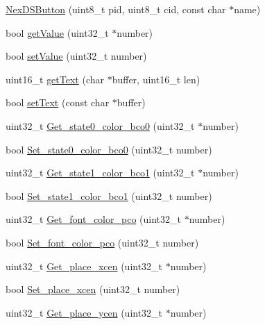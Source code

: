 \begin{DoxyCompactItemize}
\item 
\hyperlink{class_nex_d_s_button_a226edd2467f2fdf54848f5235b808e2b}{Nex\+D\+S\+Button} (uint8\+\_\+t pid, uint8\+\_\+t cid, const char $\ast$name)
\item 
bool \hyperlink{class_nex_d_s_button_a63e08f9a79f326c47aa66e1d0f9648c8}{get\+Value} (uint32\+\_\+t $\ast$number)
\item 
bool \hyperlink{class_nex_d_s_button_a2f696207609e0f01aadebb8b3826b0fa}{set\+Value} (uint32\+\_\+t number)
\item 
uint16\+\_\+t \hyperlink{class_nex_d_s_button_aff0f17061441139bf8797c78e4911eae}{get\+Text} (char $\ast$buffer, uint16\+\_\+t len)
\item 
bool \hyperlink{class_nex_d_s_button_aa7a83123530f2dbb3e6aa909352da5b2}{set\+Text} (const char $\ast$buffer)
\item 
uint32\+\_\+t \hyperlink{class_nex_d_s_button_a57119c8695b1dc562319b19864b68203}{Get\+\_\+state0\+\_\+color\+\_\+bco0} (uint32\+\_\+t $\ast$number)
\item 
bool \hyperlink{class_nex_d_s_button_a7276699c1ea7fccf4e52ad05443b8191}{Set\+\_\+state0\+\_\+color\+\_\+bco0} (uint32\+\_\+t number)
\item 
uint32\+\_\+t \hyperlink{class_nex_d_s_button_aa4ce6ec7a670af2df6bd5858ea20e430}{Get\+\_\+state1\+\_\+color\+\_\+bco1} (uint32\+\_\+t $\ast$number)
\item 
bool \hyperlink{class_nex_d_s_button_a42f31d9e9612d7f8403dcf46ef5e8f1a}{Set\+\_\+state1\+\_\+color\+\_\+bco1} (uint32\+\_\+t number)
\item 
uint32\+\_\+t \hyperlink{class_nex_d_s_button_a01a5a7238547cd761b69c49f1619f955}{Get\+\_\+font\+\_\+color\+\_\+pco} (uint32\+\_\+t $\ast$number)
\item 
bool \hyperlink{class_nex_d_s_button_a25e696769de8d33a3e49db15e0b55aaa}{Set\+\_\+font\+\_\+color\+\_\+pco} (uint32\+\_\+t number)
\item 
uint32\+\_\+t \hyperlink{class_nex_d_s_button_ae65ba8eab275c097fa1f9e7f8873dc5d}{Get\+\_\+place\+\_\+xcen} (uint32\+\_\+t $\ast$number)
\item 
bool \hyperlink{class_nex_d_s_button_a0bc679dfaca7aa0439f67bb91814f97a}{Set\+\_\+place\+\_\+xcen} (uint32\+\_\+t number)
\item 
uint32\+\_\+t \hyperlink{class_nex_d_s_button_a2b5c825ceaeeaa588b4830da4f154b23}{Get\+\_\+place\+\_\+ycen} (uint32\+\_\+t $\ast$number)
\item 

\end{DoxyCompactItemize}
